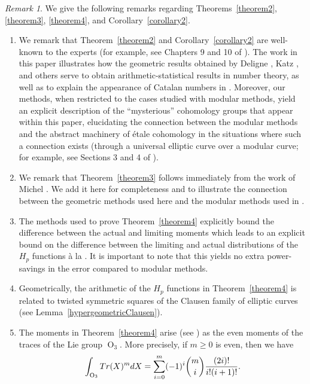 \documentclass[12pt]{amsart}
\theoremstyle{definition}
\theoremstyle{remark}
\newtheorem{remark}[theorem]{Remark}
\numberwithin{equation}{section}
\def\Tr{{\rm Tr}}
\DeclareMathOperator{\OO}{O}
\begin{document}
\begin{remark}
    We give the following remarks regarding Theorems~\ref{theorem2}, \ref{theorem3}, \ref{theorem4}, and Corollary~\ref{corollary2}.

    \begin{enumerate}
        \item We remark that Theorem~\ref{theorem2} and Corollary~\ref{corollary2} are well-known to the experts (for example, see Chapters 9 and 10 of \cite{KatzSarnak}). The work in this paper illustrates how the geometric results obtained by Deligne \cite{WeilII}, Katz \cite{KatzGKM,KatzESDE}, and others serve to obtain arithmetic-statistical results in number theory, as well as to explain the appearance of Catalan numbers in \cite{HGFDistributionOnoSaikia, 3F2Explicit, ono2024distributionhessianvaluesgaussian, grove2024hypergeometricmomentshecketrace}. Moreover, our methods, when restricted to the cases studied with modular methods, yield an explicit description of the ``mysterious'' cohomology groups that appear within this paper, elucidating the connection between the modular methods and the abstract machinery of \'etale cohomology in the situations where such a connection exists (through a universal elliptic curve over a modular curve; for example, see Sections 3 and 4 of \cite{HLLT}).

        \item We remark that Theorem~\ref{theorem3} follows immediately from the work of Michel \cite{RangMoyen}. We add it here for completeness  and to illustrate the connection between the geometric methods used here and the modular methods used in \cite{HGFDistributionOnoSaikia,ono2024distributionhessianvaluesgaussian,grove2024hypergeometricmomentshecketrace}.

        \item The methods used to prove Theorem~\ref{theorem4} explicitly bound the difference between the actual and limiting moments which leads to an explicit bound on the difference between the limiting and actual distributions of the $H_p$ functions \`a la \cite{3F2Explicit}. It is important to note that this yields no extra power-savings in the error compared to modular methods.

        \item Geometrically, the arithmetic of the $H_p$ functions in Theorem~\ref{theorem4} is related to twisted symmetric squares of the Clausen family of elliptic curves (see Lemma~\ref{hypergeometricClausen}).

        \item The moments in Theorem~\ref{theorem4} arise (see \cite{pastur2004moments}) as the even moments of the traces of the Lie group $\OO_3.$ More precisely, if $m\geq 0$ is even, then we have
        $$
        \int_{\OO_3}\Tr(X)^{m}dX = \sum\limits_{i=0}^{m}(-1)^i\binom{m}{i}\frac{(2i)!}{i!(i+1)!}.
        $$
    \end{enumerate}
\end{remark}
\end{document}

